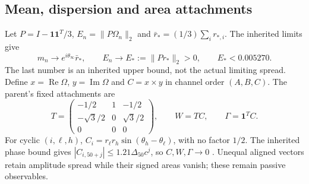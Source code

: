 \documentclass[11pt,a4paper]{article}
\numberwithin{equation}{section}
\theoremstyle{remark}\newtheorem{remark}[theorem]{Remark}
\newcommand{\one}{\mathbf 1}\newcommand{\eps}{\varepsilon}
\newcommand{\re}{\operatorname{Re}}\newcommand{\im}{\operatorname{Im}}
\begin{document}
\subsection{Mean, dispersion and area attachments}\label{sec:observables}
Let $P=I-\one\one^T/3$, $E_n=\|P\Omega_n\|_2$ and $\bar r_*=(1/3)\sum_i r_{*,i}$. The inherited limits give
\begin{equation}
m_n\longrightarrow e^{i\theta_\infty}\bar r_*,\qquad
E_n\longrightarrow E_*:=\|Pr_*\|_2>0,\qquad E_*<0.005270.
\label{eq:limits}
\end{equation}
The last number is an inherited upper bound, not the actual limiting spread. Define $x=\re\Omega$, $y=\im\Omega$ and $C=x\times y$ in channel order $(A,B,C)$. The parent's fixed attachments are
\begin{equation}
T=\begin{pmatrix}-1/2&1&-1/2\\-\sqrt3/2&0&\sqrt3/2\\0&0&0\end{pmatrix},
\qquad W=TC,\qquad\Gamma=\one^TC.\label{eq:attachments}
\end{equation}
For cyclic $(i,\ell,h)$, $C_i=r_\ell r_h\sin(\theta_h-\theta_\ell)$, with no factor $1/2$. The inherited phase bound gives $|C_{i,50+j}|\le1.21\Delta_{50}c^j$, so $C,W,\Gamma\to0$ \cite[\texttt{eq:area}, \texttt{eq:attach}, \texttt{eq:Cdecay}]{parent}. Unequal aligned vectors retain amplitude spread while their signed areas vanish; these remain passive observables.

\clearpage
\end{document}
